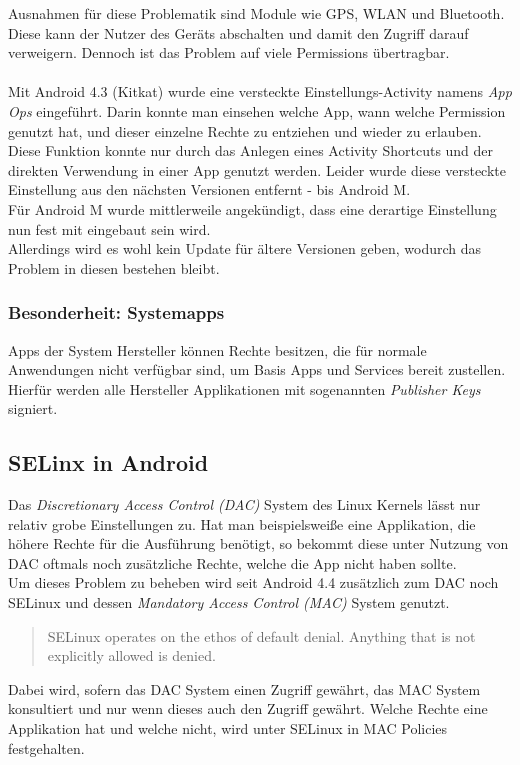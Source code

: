 	Ausnahmen für diese Problematik sind Module wie GPS, WLAN und Bluetooth. Diese kann der Nutzer des Geräts abschalten und damit den Zugriff darauf verweigern.
	Dennoch ist das Problem auf viele Permissions übertragbar.\\\\
	Mit Android 4.3 (Kitkat) wurde eine versteckte Einstellungs-Activity namens \textit{App Ops} eingeführt. Darin konnte man einsehen welche App, wann welche Permission genutzt hat, und dieser einzelne Rechte zu entziehen und wieder zu erlauben. Diese Funktion konnte nur durch das Anlegen eines Activity Shortcuts und der direkten Verwendung in einer App genutzt werden. Leider wurde diese versteckte Einstellung aus den nächsten Versionen entfernt - bis Android M. \cite{HiddenActivity} \\
	Für Android M wurde mittlerweile angekündigt, dass eine derartige Einstellung nun fest mit eingebaut sein wird.\cite{AndroidMPermission}\\
	Allerdings wird es wohl kein Update für ältere Versionen geben, wodurch das Problem in diesen bestehen bleibt.
	
	\subsubsection{Besonderheit: Systemapps}
	Apps der System Hersteller können Rechte besitzen, die für normale Anwendungen nicht verfügbar sind, um Basis Apps und Services bereit zustellen. Hierfür werden alle Hersteller Applikationen mit sogenannten \textit{Publisher Keys} signiert.
	
	\subsection{SELinx in Android}
	Das \textit{Discretionary Access Control (DAC)} System des Linux Kernels lässt nur relativ grobe Einstellungen zu. Hat man beispielsweiße eine Applikation, die höhere Rechte für die Ausführung benötigt, so bekommt diese unter Nutzung von DAC oftmals noch zusätzliche Rechte, welche die App nicht haben sollte.\\
	Um dieses Problem zu beheben wird seit Android 4.4 zusätzlich zum DAC noch SELinux und dessen \textit{Mandatory Access Control (MAC)} System genutzt.\\	
	\begin{quote}
	SELinux operates on the ethos of default denial. Anything that is not explicitly allowed is denied.\cite{SELinuxAndroid}
	\end{quote}
	Dabei wird, sofern das DAC System einen Zugriff gewährt, das MAC System konsultiert und nur wenn dieses auch den Zugriff gewährt. Welche Rechte eine Applikation hat und welche nicht, wird unter SELinux in MAC Policies festgehalten. 
	
